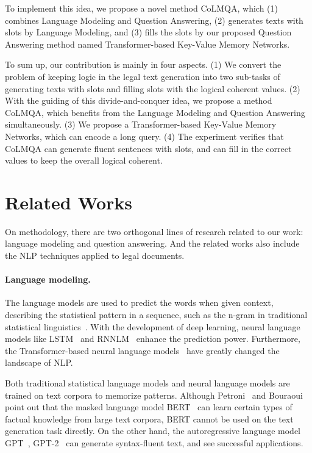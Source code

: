 \documentclass{article}
\begin{document}
To implement this idea, we propose a novel method CoLMQA, which (1) combines Language Modeling and Question Answering, (2) generates texts with slots by Language Modeling, and (3) fills the slots by our proposed Question Answering method named Transformer-based Key-Value Memory Networks. 

To sum up, our contribution is mainly in four aspects.
(1) We convert the problem of keeping logic in the legal text generation into two sub-tasks of generating texts with slots and filling slots with the logical coherent values. 
(2) With the guiding of this divide-and-conquer idea, we propose a method CoLMQA, which benefits from the Language Modeling and Question Answering simultaneously.
(3) We propose a Transformer-based Key-Value Memory Networks, which can encode a long query. 
(4) The experiment verifies that CoLMQA can generate fluent sentences with slots, and can fill in the correct values to keep the overall logical coherent. 


\section{Related Works}
On methodology, there are two orthogonal lines of research related to our work: language modeling and question answering. 
And the related works also include the NLP techniques applied to legal documents.

\paragraph{Language modeling.} The language models are used to predict the words when given context, describing the statistical pattern in a sequence, such as the n-gram in traditional statistical linguistics~\cite{bellegarda2004statistical}.
With the development of deep learning, neural language models like LSTM~\cite{hochreiter1997lstm} and RNNLM~\cite{mikolov2010recurrent} enhance the prediction power. 
Furthermore, the Transformer-based neural language models~\cite{vaswani2017attention,radford2018improving,devlin2019bert} have greatly changed the landscape of NLP.

Both traditional statistical language models and neural language models are trained on text corpora to memorize patterns.
Although Petroni~ and  Bouraoui~ point out that the masked language model BERT~\cite{devlin2019bert} can learn certain types of factual knowledge from large text corpora, BERT cannot be used on the text generation task directly.
On the other hand, the autoregressive language model GPT~\cite{radford2018improving}, GPT-2~\cite{radford2019gpt2} can generate syntax-fluent text, and see successful applications. 
\end{document}

